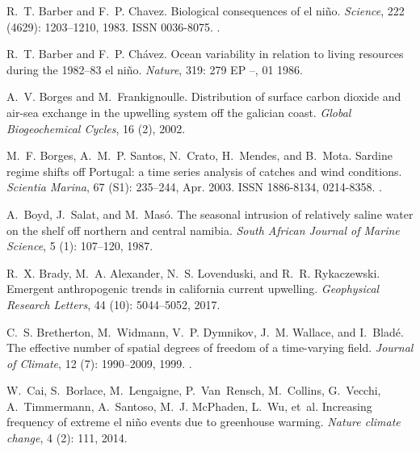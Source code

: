 \documentclass[hvmath, online,bgd]{copernicus_discussions}
\begin{document}
\begin{thebibliography}{84}
	R.~T. Barber and F.~P. Chavez.
	\newblock Biological consequences of el ni{\~n}o.
	\newblock \emph{Science}, 222 (4629): 1203--1210, 1983.
	\newblock ISSN 0036-8075.
	\newblock {}.
	
	R.~T. Barber and F.~P. Ch{\'a}vez.
	\newblock Ocean variability in relation to living resources during the 1982--83
	el ni{\~n}o.
	\newblock \emph{Nature}, 319: 279 EP --, 01 1986.
	
	A.~V. Borges and M.~Frankignoulle.
	\newblock Distribution of surface carbon dioxide and air-sea exchange in the
	upwelling system off the galician coast.
	\newblock \emph{Global Biogeochemical Cycles}, 16 (2), 2002.
	
	M.~F. Borges, A.~M.~P. Santos, N.~Crato, H.~Mendes, and B.~Mota.
	\newblock Sardine regime shifts off {Portugal}: a time series analysis of
	catches and wind conditions.
	\newblock \emph{Scientia Marina}, 67 (S1): 235--244, Apr.
	2003.
	\newblock ISSN 1886-8134, 0214-8358.
	\newblock {}.
	
	A.~Boyd, J.~Salat, and M.~Mas{\'o}.
	\newblock The seasonal intrusion of relatively saline water on the shelf off
	northern and central namibia.
	\newblock \emph{South African Journal of Marine Science}, 5
	(1): 107--120, 1987.
	
	R.~X. Brady, M.~A. Alexander, N.~S. Lovenduski, and R.~R. Rykaczewski.
	\newblock Emergent anthropogenic trends in california current upwelling.
	\newblock \emph{Geophysical Research Letters}, 44 (10):
	5044--5052, 2017.
	
	C.~S. Bretherton, M.~Widmann, V.~P. Dymnikov, J.~M. Wallace, and I.~Blad{\'e}.
	\newblock The effective number of spatial degrees of freedom of a time-varying
	field.
	\newblock \emph{Journal of Climate}, 12 (7): 1990--2009,
	1999.
	\newblock {}.
	
	W.~Cai, S.~Borlace, M.~Lengaigne, P.~Van~Rensch, M.~Collins, G.~Vecchi,
	A.~Timmermann, A.~Santoso, M.~J. McPhaden, L.~Wu, et~al.
	\newblock Increasing frequency of extreme el ni{\~n}o events due to greenhouse
	warming.
	\newblock \emph{Nature climate change}, 4 (2): 111, 2014.
	

\end{thebibliography}
\end{document}
